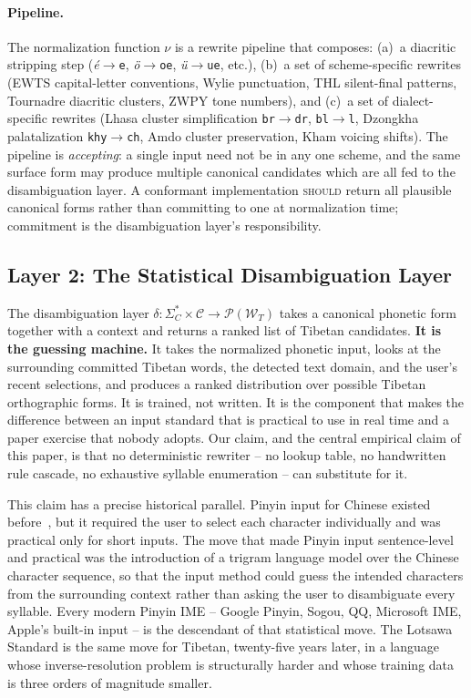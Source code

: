 \documentclass[11pt]{article}
\begin{document}
\paragraph{Pipeline.} The normalization function $\nu$ is a rewrite pipeline that composes: (a)~a diacritic stripping step (\textit{é}$\to$\texttt{e}, \textit{ö}$\to$\texttt{oe}, \textit{ü}$\to$\texttt{ue}, etc.), (b)~a set of scheme-specific rewrites (EWTS capital-letter conventions, Wylie punctuation, THL silent-final patterns, Tournadre diacritic clusters, ZWPY tone numbers), and (c)~a set of dialect-specific rewrites (Lhasa cluster simplification \texttt{br}$\to$\texttt{dr}, \texttt{bl}$\to$\texttt{l}, Dzongkha palatalization \texttt{khy}$\to$\texttt{ch}, Amdo cluster preservation, Kham voicing shifts). The pipeline is \emph{accepting}: a single input need not be in any one scheme, and the same surface form may produce multiple canonical candidates which are all fed to the disambiguation layer. A conformant implementation \textsc{should} return all plausible canonical forms rather than committing to one at normalization time; commitment is the disambiguation layer's responsibility.

\subsection{Layer 2: The Statistical Disambiguation Layer}
\label{sec:layer-disambiguation}
\label{sec:disambiguation}

The disambiguation layer $\delta: \Sigma_C^* \times \mathcal{C} \to \mathcal{P}(\mathcal{W}_T)$ takes a canonical phonetic form together with a context and returns a ranked list of Tibetan candidates. \textbf{It is the guessing machine.} It takes the normalized phonetic input, looks at the surrounding committed Tibetan words, the detected text domain, and the user's recent selections, and produces a ranked distribution over possible Tibetan orthographic forms. It is trained, not written. It is the component that makes the difference between an input standard that is practical to use in real time and a paper exercise that nobody adopts. Our claim, and the central empirical claim of this paper, is that no deterministic rewriter -- no lookup table, no handwritten rule cascade, no exhaustive syllable enumeration -- can substitute for it.

This claim has a precise historical parallel. Pinyin input for Chinese existed before~\citet{chen2000pinyin}, but it required the user to select each character individually and was practical only for short inputs. The move that made Pinyin input sentence-level and practical was the introduction of a trigram language model over the Chinese character sequence, so that the input method could guess the intended characters from the surrounding context rather than asking the user to disambiguate every syllable. Every modern Pinyin IME -- Google Pinyin, Sogou, QQ, Microsoft IME, Apple's built-in input -- is the descendant of that statistical move. The Lotsawa Standard is the same move for Tibetan, twenty-five years later, in a language whose inverse-resolution problem is structurally harder and whose training data is three orders of magnitude smaller.
\end{document}
